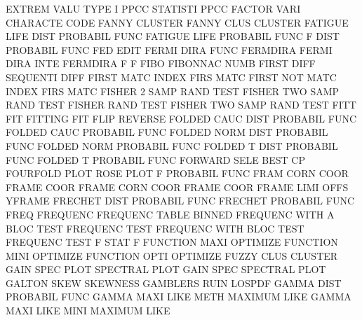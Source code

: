 EXTREM   VALU TYPE I    PPCC            STATISTI PPCC
FACTOR   VARI                           CHARACTE CODE
FANNY                                   CLUSTER
FANNY    CLUS                           CLUSTER
FATIGUE  LIFE DIST                      PROBABIL FUNC
FATIGUE  LIFE                           PROBABIL FUNC
F        DIST                           PROBABIL FUNC
FED                                     EDIT
FERMI    DIRA FUNC                      FERMDIRA
FERMI    DIRA INTE                      FERMDIRA
F                                       F
FIBO                                    FIBONNAC NUMB
FIRST    DIFF                           SEQUENTI DIFF
FIRST    MATC                           INDEX    FIRS MATC
FIRST    NOT  MATC                      INDEX    FIRS MATC
FISHER   2    SAMP RAND TEST            FISHER   TWO  SAMP RAND TEST
FISHER   RAND TEST                      FISHER   TWO  SAMP RAND TEST
FITT                                    FIT
FITTING                                 FIT
FLIP                                    REVERSE
FOLDED   CAUC DIST                      PROBABIL FUNC
FOLDED   CAUC                           PROBABIL FUNC
FOLDED   NORM DIST                      PROBABIL FUNC
FOLDED   NORM                           PROBABIL FUNC
FOLDED   T    DIST                      PROBABIL FUNC
FOLDED   T                              PROBABIL FUNC
FORWARD  SELE                           BEST     CP
FOURFOLD PLOT                           ROSE     PLOT
F                                       PROBABIL FUNC
FRAM     CORN COOR                      FRAME    COOR
FRAME    CORN COOR                      FRAME    COOR
FRAME    LIMI OFFS                      YFRAME
FRECHET  DIST                           PROBABIL FUNC
FRECHET                                 PROBABIL FUNC
FREQ                                    FREQUENC
FREQUENC TABLE                          BINNED
FREQUENC WITH A    BLOC TEST            FREQUENC TEST
FREQUENC WITH BLOC TEST                 FREQUENC TEST
F        STAT                           F
FUNCTION MAXI                           OPTIMIZE
FUNCTION MINI                           OPTIMIZE
FUNCTION OPTI                           OPTIMIZE
FUZZY    CLUS                           CLUSTER
GAIN     SPEC PLOT                      SPECTRAL PLOT
GAIN     SPEC                           SPECTRAL PLOT
GALTON   SKEW                           SKEWNESS
GAMBLERS RUIN                           LOSPDF
GAMMA    DIST                           PROBABIL FUNC
GAMMA    MAXI LIKE METH                 MAXIMUM  LIKE
GAMMA    MAXI LIKE MINI                 MAXIMUM  LIKE
